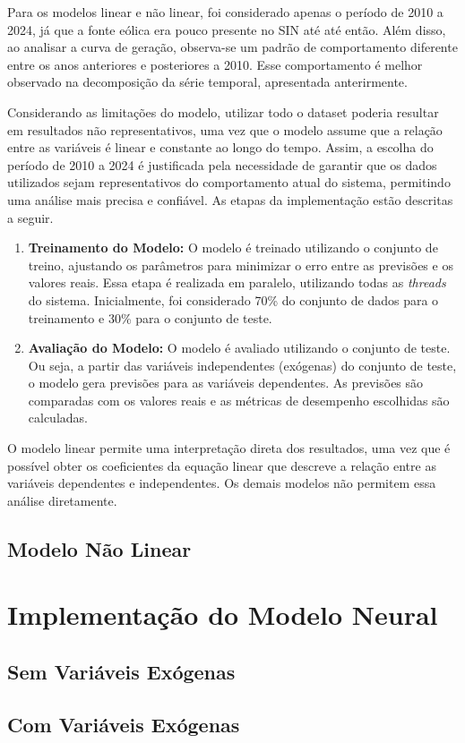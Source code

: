 Para os modelos linear e não linear, foi considerado apenas o período de 2010 a 2024, já que a fonte eólica era pouco presente
no SIN até até então. Além disso, ao analisar a curva de geração, observa-se um padrão de comportamento diferente entre os
anos anteriores e posteriores a 2010. Esse comportamento é melhor observado na decomposição da série temporal, apresentada anterirmente.

Considerando as limitações do modelo, utilizar todo o
dataset poderia resultar em resultados não representativos, uma vez que o modelo assume que a relação entre as variáveis
é linear e constante ao longo do tempo. Assim, a escolha do período de 2010 a 2024 é justificada pela necessidade de garantir
que os dados utilizados sejam representativos do comportamento atual do sistema, permitindo uma análise mais precisa e confiável.
As etapas da implementação estão descritas a seguir.

\begin{enumerate}
    \item \textbf{Treinamento do Modelo:} O modelo é treinado utilizando o conjunto de treino, ajustando os parâmetros para minimizar
o erro entre as previsões e os valores reais. Essa etapa é realizada em paralelo, utilizando todas as \textit{threads} do sistema.
Inicialmente, foi considerado 70\% do conjunto de dados para o treinamento e 30\% para o conjunto de teste.

    \item \textbf{Avaliação do Modelo:} O modelo é avaliado utilizando o conjunto de teste. Ou seja, a partir das variáveis independentes
(exógenas) do conjunto de teste, o modelo gera previsões para as variáveis dependentes. As previsões são comparadas com os valores reais
e as métricas de desempenho escolhidas são calculadas.
\end{enumerate}

O modelo linear permite uma interpretação direta dos resultados, uma vez que é possível obter os coeficientes da equação
linear que descreve a relação entre as variáveis dependentes e independentes. Os demais modelos não permitem essa análise diretamente.

\subsection{Modelo Não Linear} %


\section{Implementação do Modelo Neural} %


\subsection{Sem Variáveis Exógenas} %


\subsection{Com Variáveis Exógenas} %